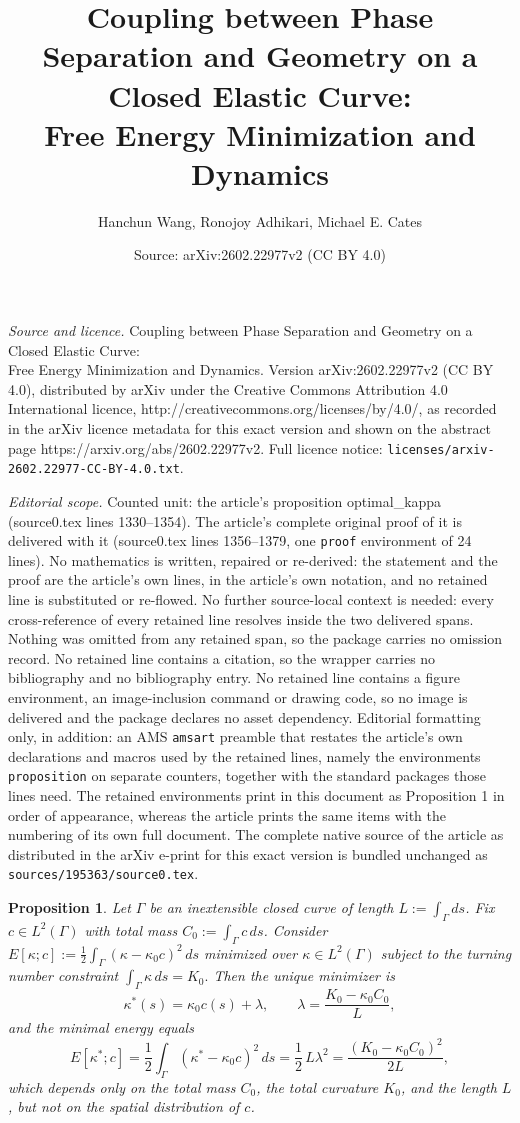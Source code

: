 \documentclass[10pt,a4paper]{amsart}
\title{Coupling between Phase Separation and Geometry on a Closed Elastic Curve:\\ Free Energy Minimization and Dynamics}
\author{Hanchun Wang, Ronojoy Adhikari, Michael E. Cates}
\date{Source: arXiv:2602.22977v2 (CC BY 4.0)}
\newtheorem{proposition}{Proposition}
\begin{document}
\maketitle

\noindent\emph{Source and licence.} Coupling between Phase Separation and Geometry on a Closed Elastic Curve:\\ Free Energy Minimization and Dynamics. Version arXiv:2602.22977v2 (CC BY 4.0), distributed by arXiv under the Creative Commons Attribution 4.0 International licence, http://creativecommons.org/licenses/by/4.0/, as recorded in the arXiv licence metadata for this exact version and shown on the abstract page https://arxiv.org/abs/2602.22977v2. Full licence notice: \texttt{licenses/arxiv-2602.22977-CC-BY-4.0.txt}.\par\smallskip

\noindent\textit{Editorial scope.} Counted unit: the article's proposition optimal\_kappa (source0.tex lines 1330--1354). The article's complete original proof of it is delivered with it (source0.tex lines 1356--1379, one \texttt{proof} environment of 24 lines). No mathematics is written, repaired or re-derived: the statement and the proof are the article's own lines, in the article's own notation, and no retained line is substituted or re-flowed.  No further source-local context is needed: every cross-reference of every retained line resolves inside the two delivered spans.  Nothing was omitted from any retained span, so the package carries no omission record.  No retained line contains a citation, so the wrapper carries no bibliography and no bibliography entry.  No retained line contains a figure environment, an image-inclusion command or drawing code, so no image is delivered and the package declares no asset dependency.  Editorial formatting only, in addition: an AMS \texttt{amsart} preamble that restates the article's own declarations and macros used by the retained lines, namely the environments \texttt{proposition} on separate counters, together with the standard packages those lines need.  The retained environments print in this document as Proposition 1 in order of appearance, whereas the article prints the same items with the numbering of its own full document.  The complete native source of the article as distributed in the arXiv e-print for this exact version is bundled unchanged as \texttt{sources/195363/source0.tex}.
\begin{proposition}\label{prop: optimal_kappa}
Let $\Gamma$ be an inextensible closed curve of length $L:=\int_\Gamma ds$. Fix $c\in L^2(\Gamma)$ with total mass $C_0:=\int_\Gamma c\,ds$.
Consider
$
E[\kappa;c]:=\frac12\int_\Gamma (\kappa-\kappa_0 c)^2\,ds
$
minimized over $\kappa\in L^2(\Gamma)$ subject to the turning number constraint
$
\int_\Gamma \kappa\,ds = K_0.
$
Then the unique minimizer is
$$
\kappa^*(s)=\kappa_0 c(s)+\lambda,
\qquad
\lambda=\frac{K_0-\kappa_0 C_0}{L},
$$
and the minimal energy equals
$$
E[\kappa^*;c]
=\frac12\int_\Gamma (\kappa^*-\kappa_0 c)^2\,ds
=\frac12\,L\lambda^2
=\frac{(K_0-\kappa_0 C_0)^2}{2L},
$$
which depends only on the total mass $C_0$, the total curvature $K_0$, and the length $L$, but not on the spatial distribution of $c$.
\end{proposition}
\end{document}
